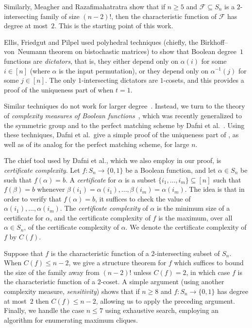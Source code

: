 \documentclass[10pt,a4paper]{amsart}
\theoremstyle{definition}
\begin{document}
Similarly, Meagher and Razafimahatratra show that if $n \geq 5$ and $\mathcal{F} \subseteq S_n$ is a $2$-intersecting family of size $(n-2)!$, then the characteristic function of $\mathcal{F}$ has degree at most~$2$. This is the starting point of this work.

Ellis, Friedgut and Pilpel used polyhedral techniques (chiefly, the Birkhoff--von~Neumann theorem on bistochastic matrices) to show that Boolean degree~$1$ functions are \emph{dictators}, that is, they either depend only on $\alpha(i)$ for some $i \in [n]$ (where $\alpha$ is the input permutation), or they depend only on $\alpha^{-1}(j)$ for some $j \in [n]$. The only $1$-intersecting dictators are $1$-cosets, and this provides a proof of the uniqueness part of  when $t = 1$.

Similar techniques do not work for larger degree~\cite{FilmusComment}.
Instead, we turn to the theory of \emph{complexity measures of Boolean functions}~\cite{BuhrmandeWolf}, which was recently generalized to the symmetric group and to the perfect matching scheme by Dafni et al.~\cite{DFLLV}. Using these techniques, Dafni et al.\ give a simple proof of the uniqueness part of , as well as of its analog for the perfect matching scheme, for large $n$.

The chief tool used by Dafni et al., which we also employ in our proof, is \emph{certificate complexity}. Let $f\colon S_n \to \{0,1\}$ be a Boolean function, and let $\alpha \in S_n$ be such that $f(\alpha) = b$. A \emph{certificate} for $\alpha$ is a subset $\{i_1,\ldots,i_m\} \subseteq [n]$ such that $f(\beta) = b$ whenever $\beta(i_1) = \alpha(i_1),\ldots,\beta(i_m) = \alpha(i_m)$. The idea is that in order to verify that $f(\alpha) = b$, it suffices to check the value of $\alpha(i_1),\ldots,\alpha(i_m)$. The \emph{certificate complexity} of $\alpha$ is the minimum size of a certificate for $\alpha$, and the certificate complexity of $f$ is the maximum, over all $\alpha \in S_n$, of the certificate complexity of $\alpha$. We denote the certificate complexity of $f$ by $C(f)$.

Suppose that $f$ is the characteristic function of a $2$-intersecting subset of $S_n$. When $C(f) \leq n-2$, we give a structure theorem for $f$ which suffices to bound the size of the family away from $(n-2)!$ unless $C(f) = 2$, in which case $f$ is the characteristic function of a $2$-coset. A simple argument (using another complexity measure, \emph{sensitivity}) shows that if $n \geq 8$ and $f\colon S_n \to \{0,1\}$ has degree at most~$2$ then $C(f) \leq n-2$, allowing us to apply the preceding argument. Finally, we handle the case $n \le 7$ using exhaustive search, employing an algorithm for enumerating maximum cliques.
\end{document}
